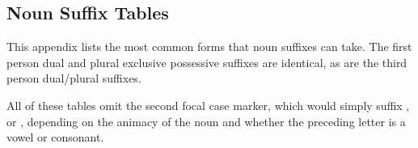\documentclass[grammar]{subfiles}
\begin{document}
\begin{landscape}

  \appendix
  \chapter{Noun Suffix Tables}
  \label{app:noun_suffix_tables}

  This appendix lists the most common forms that noun suffixes can take.  The
  first person dual and plural exclusive possessive suffixes are identical, as
  are the third person dual/plural suffixes.

  All of these tables omit the second focal case marker, which would simply
  suffix ,  or , depending on the animacy of
  the noun and whether the preceding letter is a vowel or consonant.



\end{landscape}
\end{document}
